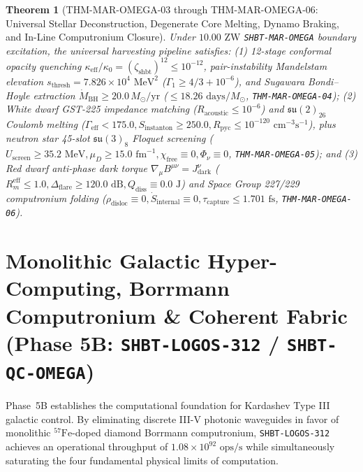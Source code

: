 \documentclass[11pt,onecolumn]{article}
\newtheorem{theorem}{Theorem}
\begin{document}
\begin{theorem}[THM-MAR-OMEGA-03 through THM-MAR-OMEGA-06: Universal Stellar Deconstruction, Degenerate Core Melting, Dynamo Braking, and In-Line Computronium Closure]
\label{thm:mar_omega_03_06}
Under $10.00\text{ ZW}$ \texttt{SHBT-MAR-OMEGA} boundary excitation, the universal harvesting pipeline satisfies: (1) 12-stage conformal opacity quenching $\kappa_{\text{eff}}/\kappa_0 = (\zeta_{\text{shbt}})^{12} \le 10^{-12}$, pair-instability Mandelstam elevation $s_{\text{thresh}} = 7.826 \times 10^4\text{ MeV}^2$ ($\Gamma_1 \ge 4/3 + 10^{-6}$), and Sugawara Bondi--Hoyle extraction $\dot{M}_{\text{BH}} \ge 20.0\,M_\odot/\text{yr}$ ($\le 18.26\text{ days}/M_\odot$, \texttt{THM-MAR-OMEGA-04}); (2) White dwarf GST-225 impedance matching ($R_{\text{acoustic}} \le 10^{-6}$) and $\mathfrak{su}(2)_{26}$ Coulomb melting ($\Gamma_{\text{eff}} < 175.0, S_{\text{instanton}} \ge 250.0, R_{\text{pyc}} \le 10^{-120}\text{ cm}^{-3}\text{s}^{-1}$), plus neutron star 45-slot $\mathfrak{su}(3)_8$ Floquet screening ($U_{\text{screen}} \ge 35.2\text{ MeV}, \mu_D \ge 15.0\text{ fm}^{-1}, \chi_{\text{free}} \equiv 0, \Phi_\nu \equiv 0$, \texttt{THM-MAR-OMEGA-05}); and (3) Red dwarf anti-phase dark torque $\nabla_\mu B^{\mu\nu} = J_{\text{dark}}^\nu$ ($R_m^{\text{eff}} \le 1.0, \Delta_{\text{flare}} \ge 120.0\text{ dB}, Q_{\text{diss}} \equiv 0.0\text{ J}$) and Space Group 227/229 computronium folding ($\rho_{\text{disloc}} \equiv 0, \dot{S}_{\text{internal}} \equiv 0, \tau_{\text{capture}} \le 1.701\text{ fs}$, \texttt{THM-MAR-OMEGA-06}).
\end{theorem}
\FloatBarrier

\section{Monolithic Galactic Hyper-Computing, Borrmann Computronium \& Coherent Fabric (Phase 5B: \texttt{SHBT-LOGOS-312} / \texttt{SHBT-QC-OMEGA})}
\label{sec:logos_hypercomputer}

Phase~5B establishes the computational foundation for Kardashev Type III galactic control. By eliminating discrete III-V photonic waveguides in favor of monolithic $^{57}\text{Fe}$-doped diamond Borrmann computronium, \texttt{SHBT-LOGOS-312} achieves an operational throughput of $1.08 \times 10^{92}\text{ ops/s}$ while simultaneously saturating the four fundamental physical limits of computation.
\end{document}
